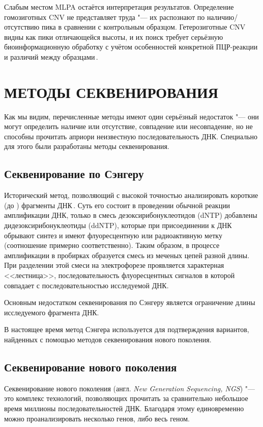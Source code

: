\documentclass[12pt, twoside, a4paper]{article}
\newcommand{\engterm}[1]{англ. \textenglish{\textit{#1}}}
\begin{document}
Слабым местом MLPA остаётся интерпретация результатов.
Определение гомозиготных CNV не представляет труда "--- их распознают по наличию/отсутствию пика в сравнении с контрольным образцом.
Гетерозиготные CNV видны как пики отличающейся высоты, и их поиск требует серьёзную биоинформационную обработку с учётом особенностей конкретной ПЦР\hyp{}реакции и различий между образцами\,\cite{Stuppia_2012}.

\section{МЕТОДЫ СЕКВЕНИРОВАНИЯ}

Как мы видим, перечисленные методы имеют один серьёзный недостаток "--- они могут определить наличие или отсутствие, совпадение или несовпадение, но не способны прочитать априори неизвестную последовательность ДНК.
Специально для этого были разработаны методы секвенирования.

\subsection*{Секвенирование по Сэнгеру}

Исторический метод, позволяющий с высокой точностью анализировать короткие (до ) фрагменты ДНК\,\cite{Sanger_1977}.
Суть его состоит в проведении обычной реакции амплификации ДНК, только в смесь дезоксирибонуклеотидов (dNTP) добавлены дидезоксирибонуклеотиды (ddNTP), которые при присоединении к ДНК обрывают синтез и имеют флуоресцентную или радиоактивную метку (соотношение примерно  соответственно).
Таким образом, в процессе амплификации в пробирках образуется смесь из меченых цепей разной длины.
При разделении этой смеси на электрофорезе проявляется характерная <<лестница>>, последовательность флуоресцентных сигналов в которой совпадает с последовательностью исследуемой ДНК.

Основным недостатком секвенирования по Сэнгеру является ограничение длины исследуемого фрагмента ДНК.

В настоящее время метод Сэнгера используется для подтверждения вариантов, найденных с помощью методов секвенирования нового поколения.

\subsection*{Секвенирование нового поколения}

Секвенирование нового поколения (\engterm{New Generation Sequencing, NGS}) "--- это комплекс технологий, позволяющих прочитать за сравнительно небольшое время миллионы последовательностей ДНК.
Благодаря этому единовременно можно проанализировать несколько генов, либо весь геном.
\end{document}
